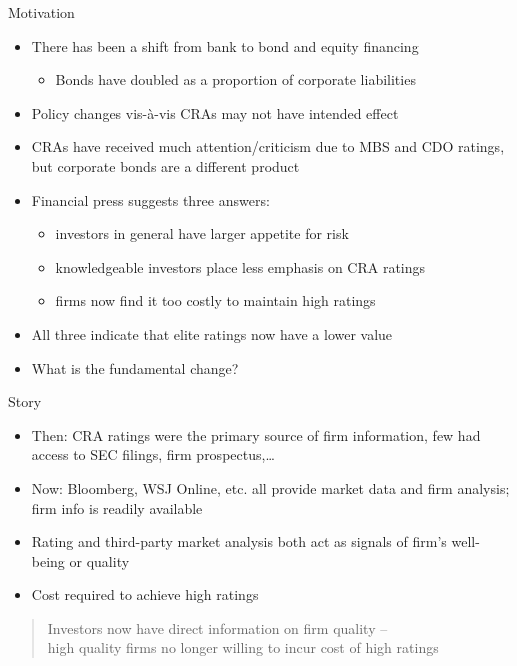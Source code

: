 \documentclass{beamer}
\begin{document}
\begin{frame}{Motivation}
\begin{itemize}
	\item There has been a shift from bank to bond and equity financing
	\begin{itemize}
		\item Bonds have doubled as a proportion of corporate liabilities
	\end{itemize}
	\item Policy changes vis-\`{a}-vis CRAs may not have intended effect
	\item CRAs have received much attention/criticism due to MBS and CDO ratings, but corporate bonds are a different product
	\item Financial press suggests three answers:
	\begin{itemize}
		\item investors in general have larger appetite for risk
		\item knowledgeable investors place less emphasis on CRA ratings
		\item firms now find it too costly to maintain high ratings
	\end{itemize}
	\item All three indicate that elite ratings now have a lower value
	\item What is the fundamental change?
\end{itemize}
\end{frame}


\begin{frame}{Story}
\begin{itemize}
	\item \alert<1>{Then:} CRA ratings were the primary source of firm information, few had access to SEC filings, firm prospectus,\ldots
	\item \alert<2>{Now:} Bloomberg, WSJ Online, etc. all provide market data and firm analysis; firm info is readily available
	\item Rating and third-party market analysis both act as signals of firm's well-being or quality
	\item Cost required to achieve high ratings
\end{itemize}
\begin{quote}
Investors now have direct information on firm quality -- \\ high quality firms no longer willing to incur cost of high ratings
\end{quote}
\end{frame}
\end{document}
